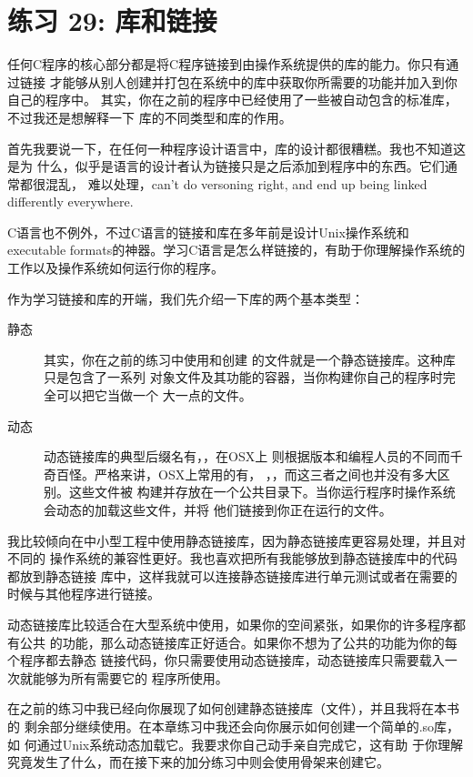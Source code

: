 \chapter{练习 29: 库和链接}

任何C程序的核心部分都是将C程序链接到由操作系统提供的库的能力。你只有通过链接
才能够从别人创建并打包在系统中的库中获取你所需要的功能并加入到你自己的程序中。
其实，你在之前的程序中已经使用了一些被自动包含的标准库，不过我还是想解释一下
库的不同类型和库的作用。

首先我要说一下，在任何一种程序设计语言中，库的设计都很糟糕。我也不知道这是为
什么，似乎是语言的设计者认为链接只是之后添加到程序中的东西。它们通常都很混乱，
难以处理，can't do versoning right, and end up being linked differently everywhere.

C语言也不例外，不过C语言的链接和库在多年前是设计Unix操作系统和executable
formats的神器。学习C语言是怎么样链接的，有助于你理解操作系统的工作以及操作系统如何运行你的程序。

作为学习链接和库的开端，我们先介绍一下库的两个基本类型：

\begin{description}
\item[静态] 其实，你在之前的练习中使用和创建
    的文件就是一个静态链接库。这种库只是包含了一系列
    对象文件及其功能的容器，当你构建你自己的程序时完全可以把它当做一个
    大一点的文件。
\item[动态] 动态链接库的典型后缀名有，，在OSX上
    则根据版本和编程人员的不同而千奇百怪。严格来讲，OSX上常用的有，
    ，，而这三者之间也并没有多大区别。这些文件被
    构建并存放在一个公共目录下。当你运行程序时操作系统会动态的加载这些文件，并将
    他们链接到你正在运行的文件。
\end{description}

我比较倾向在中小型工程中使用静态链接库，因为静态链接库更容易处理，并且对不同的
操作系统的兼容性更好。我也喜欢把所有我能够放到静态链接库中的代码都放到静态链接
库中，这样我就可以连接静态链接库进行单元测试或者在需要的时候与其他程序进行链接。

动态链接库比较适合在大型系统中使用，如果你的空间紧张，如果你的许多程序都有公共
的功能，那么动态链接库正好适合。如果你不想为了公共的功能为你的每个程序都去静态
链接代码，你只需要使用动态链接库，动态链接库只需要载入一次就能够为所有需要它的
程序所使用。

在之前的练习中我已经向你展现了如何创建静态链接库（文件），并且我将在本书的
剩余部分继续使用。在本章练习中我还会向你展示如何创建一个简单的.so库，如
何通过Unix系统动态加载它。我要求你自己动手亲自完成它，这有助
于你理解究竟发生了什么，而在接下来的加分练习中则会使用骨架来创建它。

